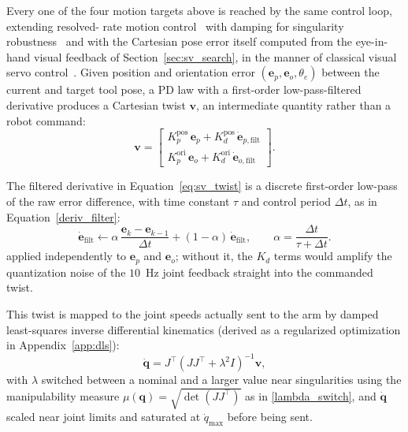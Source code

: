 Every one of the four motion targets above is reached by the same control loop, extending resolved-
rate motion control~\citep{whitney1969resolved} with damping for singularity
robustness~\citep{wampler1986manipulator,chiaverini1994review,nakamura1986inverse} and with the
Cartesian pose error itself computed from the eye-in-hand visual feedback of
Section~\ref{sec:sv_search}, in the manner of classical visual servo
control~\citep{hutchinson1996tutorial}. Given position and orientation error
$(\mathbf{e}_p, \mathbf{e}_o, \theta_e)$ between the current and target tool pose, a PD law with a
first-order low-pass-filtered derivative produces a Cartesian twist $\mathbf{v}$, an intermediate
quantity rather than a robot command:
\begin{equation}
\mathbf{v} =
\begin{bmatrix}
K_p^{\text{pos}}\,\mathbf{e}_p + K_d^{\text{pos}}\,\dot{\mathbf{e}}_{p,\text{filt}} \\
K_p^{\text{ori}}\,\mathbf{e}_o + K_d^{\text{ori}}\,\dot{\mathbf{e}}_{o,\text{filt}}
\end{bmatrix}.
\label{eq:sv_twist}
\end{equation}

The filtered derivative in Equation~\eqref{eq:sv_twist} is a discrete first-order low-pass of the raw error difference, with time constant $\tau$ and control period $\Delta t$, as in Equation~\eqref{deriv_filter}:
\begin{equation}
\dot{\mathbf{e}}_{\mathrm{filt}}
\leftarrow
\alpha\,\frac{\mathbf{e}_{k}-\mathbf{e}_{k-1}}{\Delta t}
+
(1-\alpha)\,\dot{\mathbf{e}}_{\mathrm{filt}},
\qquad
\alpha=\frac{\Delta t}{\tau+\Delta t}.
\label{deriv_filter}
\end{equation}
applied independently to $\mathbf e_p$ and $\mathbf e_o$; without it, the $K_d$ terms would amplify the quantization noise of the $10$~Hz joint feedback straight into the commanded twist.


This twist is mapped to the joint speeds actually sent to the arm by damped least-squares inverse
differential kinematics (derived as a regularized optimization in Appendix~\ref{app:dls}):
\begin{equation}
\dot{\mathbf{q}} = J^\top \left( J J^\top + \lambda^2 I \right)^{-1} \mathbf{v},
\label{eq:sv_dls}
\end{equation}
with $\lambda$ switched between a nominal and a larger value near singularities using the
manipulability measure $\mu(\mathbf{q}) = \sqrt{\det(J J^\top)}$ as in \ref{lambda_switch}, and $\dot{\mathbf{q}}$ scaled near
joint limits and saturated at $\dot{q}_{\max}$ before being sent.

